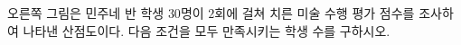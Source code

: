 \noindent\begin{minipage}[t]{0.58\linewidth}\vspace{0pt}\raggedright 오른쪽 그림은 민주네 반 학생 $30$명이 $2$회에 걸쳐 치른 미술 수행 평가 점수를 조사하여 나타낸 산점도이다. 다음 조건을 모두 만족시키는 학생 수를 구하시오. \end{minipage}\hfill\begin{minipage}[t]{0.4\linewidth}\vspace{0pt}\centering \resizebox{\ifdim\width>\linewidth\linewidth\else\width\fi}{!}{}\end{minipage}\par
\noindent {}
